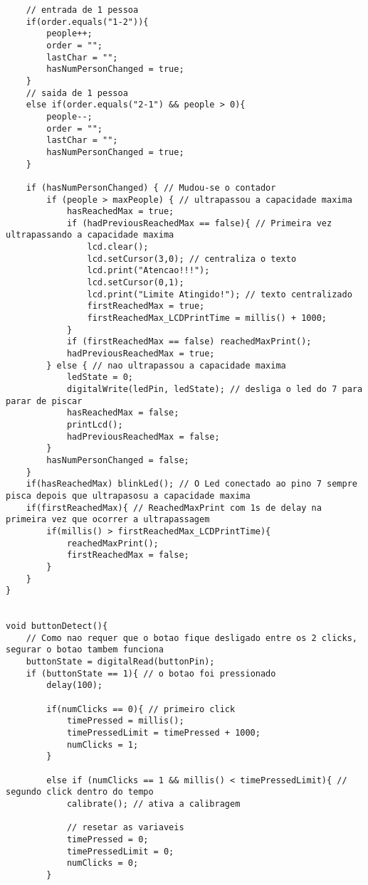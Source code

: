 \documentclass[10pt,twocolumn,letterpaper]{article}
\begin{document}
\begin{lstlisting}
    // entrada de 1 pessoa 
    if(order.equals("1-2")){
        people++;
        order = ""; 
        lastChar = "";
        hasNumPersonChanged = true;
    }
    // saida de 1 pessoa 
    else if(order.equals("2-1") && people > 0){
        people--;
        order = "";
        lastChar = "";
        hasNumPersonChanged = true;
    }

    if (hasNumPersonChanged) { // Mudou-se o contador
        if (people > maxPeople) { // ultrapassou a capacidade maxima 
            hasReachedMax = true;
            if (hadPreviousReachedMax == false){ // Primeira vez ultrapassando a capacidade maxima
                lcd.clear();
                lcd.setCursor(3,0); // centraliza o texto
                lcd.print("Atencao!!!");
                lcd.setCursor(0,1); 
                lcd.print("Limite Atingido!"); // texto centralizado
                firstReachedMax = true;
                firstReachedMax_LCDPrintTime = millis() + 1000;
            }
            if (firstReachedMax == false) reachedMaxPrint();
            hadPreviousReachedMax = true; 
        } else { // nao ultrapassou a capacidade maxima
            ledState = 0;
            digitalWrite(ledPin, ledState); // desliga o led do 7 para parar de piscar
            hasReachedMax = false;
            printLcd();
            hadPreviousReachedMax = false;
        }
        hasNumPersonChanged = false;
    }
    if(hasReachedMax) blinkLed(); // O Led conectado ao pino 7 sempre pisca depois que ultrapasosu a capacidade maxima
    if(firstReachedMax){ // ReachedMaxPrint com 1s de delay na primeira vez que ocorrer a ultrapassagem
        if(millis() > firstReachedMax_LCDPrintTime){
            reachedMaxPrint();
            firstReachedMax = false;
        }
    }
}
    

void buttonDetect(){
    // Como nao requer que o botao fique desligado entre os 2 clicks, segurar o botao tambem funciona
    buttonState = digitalRead(buttonPin);
    if (buttonState == 1){ // o botao foi pressionado
        delay(100);

        if(numClicks == 0){ // primeiro click
            timePressed = millis();
            timePressedLimit = timePressed + 1000;
            numClicks = 1;
        }

        else if (numClicks == 1 && millis() < timePressedLimit){ // segundo click dentro do tempo
            calibrate(); // ativa a calibragem

            // resetar as variaveis
            timePressed = 0;
            timePressedLimit = 0;
            numClicks = 0;
        }


\end{lstlisting}
\end{document}
